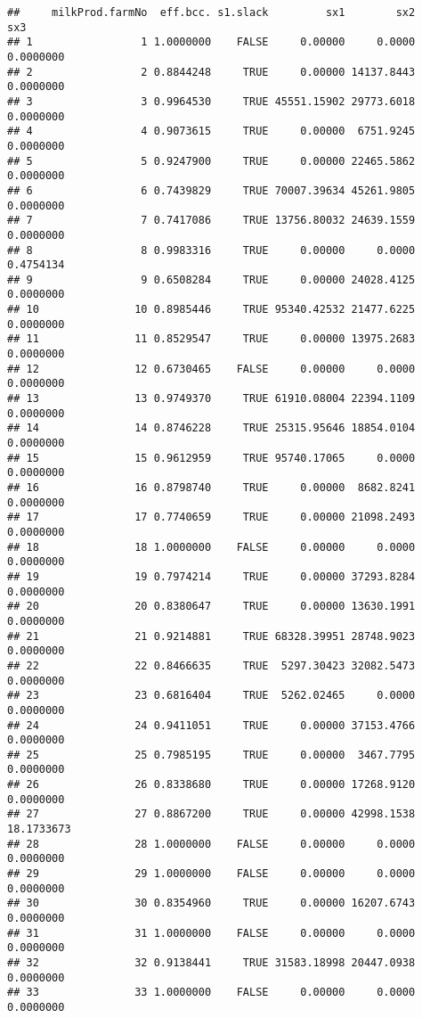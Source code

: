 \documentclass[
]{article}
\begin{document}
\begin{verbatim}
##     milkProd.farmNo  eff.bcc. s1.slack         sx1        sx2        sx3
## 1                 1 1.0000000    FALSE     0.00000     0.0000  0.0000000
## 2                 2 0.8844248     TRUE     0.00000 14137.8443  0.0000000
## 3                 3 0.9964530     TRUE 45551.15902 29773.6018  0.0000000
## 4                 4 0.9073615     TRUE     0.00000  6751.9245  0.0000000
## 5                 5 0.9247900     TRUE     0.00000 22465.5862  0.0000000
## 6                 6 0.7439829     TRUE 70007.39634 45261.9805  0.0000000
## 7                 7 0.7417086     TRUE 13756.80032 24639.1559  0.0000000
## 8                 8 0.9983316     TRUE     0.00000     0.0000  0.4754134
## 9                 9 0.6508284     TRUE     0.00000 24028.4125  0.0000000
## 10               10 0.8985446     TRUE 95340.42532 21477.6225  0.0000000
## 11               11 0.8529547     TRUE     0.00000 13975.2683  0.0000000
## 12               12 0.6730465    FALSE     0.00000     0.0000  0.0000000
## 13               13 0.9749370     TRUE 61910.08004 22394.1109  0.0000000
## 14               14 0.8746228     TRUE 25315.95646 18854.0104  0.0000000
## 15               15 0.9612959     TRUE 95740.17065     0.0000  0.0000000
## 16               16 0.8798740     TRUE     0.00000  8682.8241  0.0000000
## 17               17 0.7740659     TRUE     0.00000 21098.2493  0.0000000
## 18               18 1.0000000    FALSE     0.00000     0.0000  0.0000000
## 19               19 0.7974214     TRUE     0.00000 37293.8284  0.0000000
## 20               20 0.8380647     TRUE     0.00000 13630.1991  0.0000000
## 21               21 0.9214881     TRUE 68328.39951 28748.9023  0.0000000
## 22               22 0.8466635     TRUE  5297.30423 32082.5473  0.0000000
## 23               23 0.6816404     TRUE  5262.02465     0.0000  0.0000000
## 24               24 0.9411051     TRUE     0.00000 37153.4766  0.0000000
## 25               25 0.7985195     TRUE     0.00000  3467.7795  0.0000000
## 26               26 0.8338680     TRUE     0.00000 17268.9120  0.0000000
## 27               27 0.8867200     TRUE     0.00000 42998.1538 18.1733673
## 28               28 1.0000000    FALSE     0.00000     0.0000  0.0000000
## 29               29 1.0000000    FALSE     0.00000     0.0000  0.0000000
## 30               30 0.8354960     TRUE     0.00000 16207.6743  0.0000000
## 31               31 1.0000000    FALSE     0.00000     0.0000  0.0000000
## 32               32 0.9138441     TRUE 31583.18998 20447.0938  0.0000000
## 33               33 1.0000000    FALSE     0.00000     0.0000  0.0000000

\end{verbatim}
\end{document}
